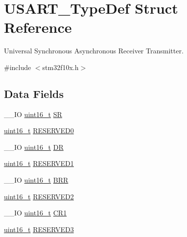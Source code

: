 \hypertarget{struct_u_s_a_r_t___type_def}{\section{U\-S\-A\-R\-T\-\_\-\-Type\-Def Struct Reference}
\label{struct_u_s_a_r_t___type_def}
}


Universal Synchronous Asynchronous Receiver Transmitter.  




{\ttfamily \#include $<$stm32f10x.\-h$>$}

\subsection*{Data Fields}
\begin{DoxyCompactItemize}
\item 
\-\_\-\-\_\-\-I\-O \hyperlink{stdint_8h_a273cf69d639a59973b6019625df33e30}{uint16\-\_\-t} \hyperlink{struct_u_s_a_r_t___type_def_a3f1fd9f0c004d3087caeba4815faa41c}{S\-R}
\item 
\hyperlink{stdint_8h_a273cf69d639a59973b6019625df33e30}{uint16\-\_\-t} \hyperlink{struct_u_s_a_r_t___type_def_a84ccd64c74c8dbc78b94172ce759de10}{R\-E\-S\-E\-R\-V\-E\-D0}
\item 
\-\_\-\-\_\-\-I\-O \hyperlink{stdint_8h_a273cf69d639a59973b6019625df33e30}{uint16\-\_\-t} \hyperlink{struct_u_s_a_r_t___type_def_accee34aaec89aad4aeef512bba173ae5}{D\-R}
\item 
\hyperlink{stdint_8h_a273cf69d639a59973b6019625df33e30}{uint16\-\_\-t} \hyperlink{struct_u_s_a_r_t___type_def_a6d78680272a465db0ee43eba4e9c54f3}{R\-E\-S\-E\-R\-V\-E\-D1}
\item 
\-\_\-\-\_\-\-I\-O \hyperlink{stdint_8h_a273cf69d639a59973b6019625df33e30}{uint16\-\_\-t} \hyperlink{struct_u_s_a_r_t___type_def_a2044eb2a0a8a731400d309741bceb2f7}{B\-R\-R}
\item 
\hyperlink{stdint_8h_a273cf69d639a59973b6019625df33e30}{uint16\-\_\-t} \hyperlink{struct_u_s_a_r_t___type_def_af2b7924854e56d0ebd3e8699dfd0e369}{R\-E\-S\-E\-R\-V\-E\-D2}
\item 
\-\_\-\-\_\-\-I\-O \hyperlink{stdint_8h_a273cf69d639a59973b6019625df33e30}{uint16\-\_\-t} \hyperlink{struct_u_s_a_r_t___type_def_a5de50313b1437f7f926093f00902d37a}{C\-R1}
\item 
\hyperlink{stdint_8h_a273cf69d639a59973b6019625df33e30}{uint16\-\_\-t} \hyperlink{struct_u_s_a_r_t___type_def_a158066c974911c14efd7ea492ea31137}{R\-E\-S\-E\-R\-V\-E\-D3}

\end{DoxyCompactItemize}

